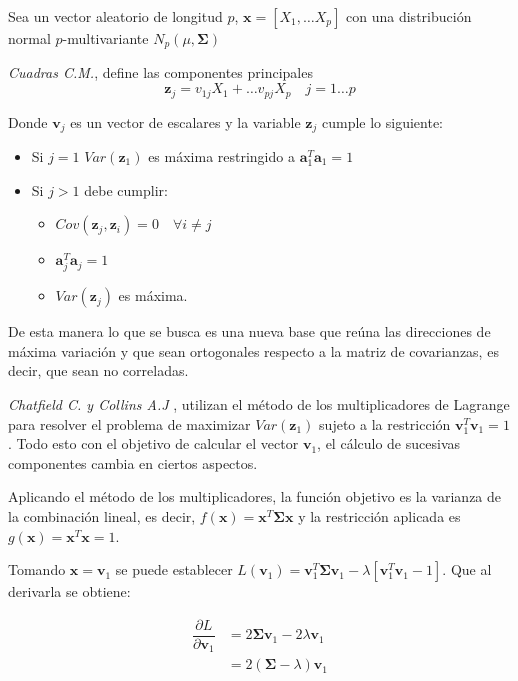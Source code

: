 \noindent Sea un vector aleatorio de longitud $p$, $\mathbf{x}=[X_1,\ldots X_p]$ con una distribución normal $p$-multivariante $N_p(\mu,\mathbf{\Sigma})$
\begin{defi}
\emph{Cuadras C.M.},\cite{Cuadras 2014} define las componentes principales 
\begin{equation}
\mathbf{z}_j=v_{1j}X_1+\ldots v_{pj}X_p \quad j=1\ldots p
\end{equation}

\noindent Donde $\textbf{v}_j$ es un vector de escalares y la variable $\textbf{z}_j$ cumple lo siguiente:
\begin{itemize}
\item Si $j=1$ $Var(\textbf{z}_1)$ es máxima restringido a $\textbf{a}_1^T \textbf{a}_1=1$
\item Si $j>1$ debe cumplir:
\begin{itemize}
\item $Cov(\textbf{z}_j,\textbf{z}_i)=0\quad \forall i\neq j $
\item $\textbf{a}_j^T \textbf{a}_j=1$
\item $Var(\textbf{z}_j)$ es máxima. 
\end{itemize}
\end{itemize}
\noindent De esta manera lo que se busca es una nueva base que reúna las direcciones de máxima variación y que sean ortogonales respecto a la matriz de covarianzas, es decir, que sean no correladas.
\end{defi}

\noindent \emph{Chatfield C. y Collins A.J} \cite{Chatfield 1989}, utilizan el método de los multiplicadores de Lagrange para resolver el problema de maximizar  $Var(\textbf{z}_1)$ sujeto a la restricción $\textbf{v}_1^T\textbf{v}_1=1$. Todo esto con el objetivo de calcular el vector $\mathbf{v}_1$, el cálculo de sucesivas componentes cambia en ciertos aspectos. 

\noindent Aplicando el método de los multiplicadores, la función objetivo es la varianza de la combinación lineal, es decir, $f(\mathbf{x})=\mathbf{x}^T \mathbf{\Sigma} \mathbf{x}$ y la restricción aplicada es $g(\textbf{x})=\textbf{x}^T\textbf{x}=1$. 

\noindent Tomando $\textbf{x}=\textbf{v}_1$ se puede establecer $L(\textbf{v}_1)=\textbf{v}_1^T \mathbf{\Sigma} \textbf{v}_1 - \lambda[\textbf{v}_1^T \textbf{v}_1-1]$. Que al derivarla se obtiene:

\begin{align*}
\dfrac{\partial L}{\partial \textbf{v}_1} &= 2\mathbf{\Sigma} \textbf{v}_1 - 2\lambda\textbf{v}_1\\
& = 2(\mathbf{\Sigma}-\lambda)\textbf{v}_1 
\end{align*}

